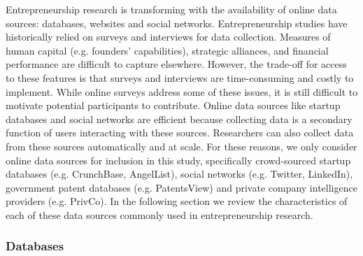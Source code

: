 \documentclass[../thesis/thesis.tex]{subfiles}
\begin{document}
Entrepreneurship research is transforming with the availability of online data sources: databases, websites and social networks. Entrepreneurship studies have historically relied on surveys and interviews for data collection. Measures of human capital (e.g. founders' capabilities), strategic alliances, and financial performance are difficult to capture elsewhere. However, the trade-off for access to these features is that surveys and interviews are time-consuming and costly to implement. While online surveys address some of these issues, it is still difficult to motivate potential participants to contribute. Online data sources like startup databases and social networks are efficient because collecting data is a secondary function of users interacting with these sources. Researchers can also collect data from these sources automatically and at scale. For these reasons, we only consider online data sources for inclusion in this study, specifically crowd-sourced startup databases (e.g. CrunchBase, AngelList), social networks (e.g. Twitter, LinkedIn), government patent databases (e.g. PatentsView) and private company intelligence providers (e.g. PrivCo). In the following section we review the characteristics of each of these data sources commonly used in entrepreneurship research.

\subsubsection{Databases}
\end{document}

